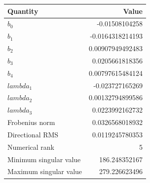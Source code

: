 \begin{tabular}{lr}\hline Quantity & Value\\\hline
$b_0$ & -0.01508104258\\
$b_1$ & -0.0164318214193\\
$b_2$ & 0.00907949492483\\
$b_3$ & 0.0205661818356\\
$b_4$ & 0.00797615484124\\
$lambda_1$ & -0.023727165269\\
$lambda_2$ & 0.00132794899586\\
$lambda_3$ & 0.0223992162732\\
Frobenius norm & 0.0326568018932\\
Directional RMS & 0.0119245780353\\
Numerical rank & 5\\
Minimum singular value & 186.248352167\\
Maximum singular value & 279.226623496\\
\hline\end{tabular}
